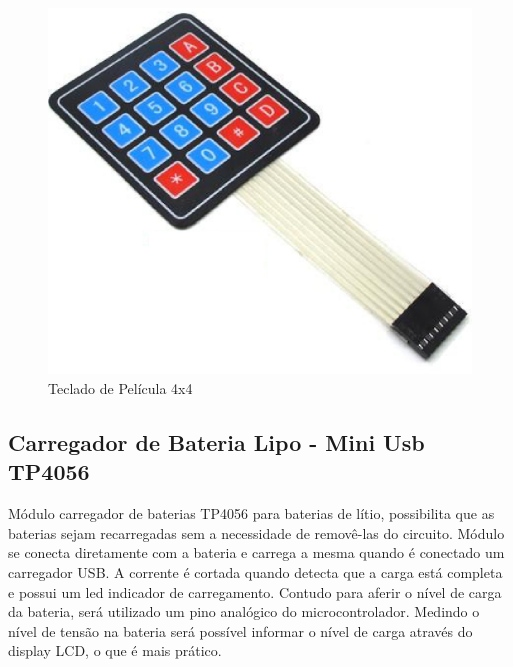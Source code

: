 \begin{figure}[!h]
  \centering
  \includegraphics[keepaspectratio=true,scale=0.45]{figuras/teclado.eps}
  \caption{Teclado de Película 4x4}
\end{figure}

\subsection{Carregador de Bateria Lipo - Mini Usb TP4056}
Módulo carregador de baterias TP4056 para baterias de lítio, possibilita que as baterias sejam recarregadas sem a necessidade de removê-las do circuito. Módulo se conecta diretamente com a bateria e carrega a mesma quando é conectado um carregador USB. A corrente é cortada quando detecta que a carga está completa e possui um led indicador de carregamento. Contudo para aferir o nível de carga da bateria, será utilizado um pino analógico do microcontrolador. Medindo o nível de tensão na bateria será possível  informar o  nível de  carga através do display LCD, o que é mais prático.


